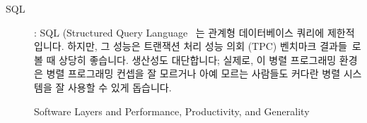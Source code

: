 \begin{description}

\item[SQL]: SQL (Structured Query Language~\cite{DIS9075SQL92} 는 관계형
	데이터베이스 쿼리에 제한적입니다.
	하지만, 그 성능은 트랜잭션 처리 성능 의회 (TPC) 벤치마크
	결과들~\cite{TPC}로 볼 때 상당히 좋습니다.
	생산성도 대단합니다; 실제로, 이 병렬 프로그래밍 환경은 병렬 프로그래밍
	컨셉을 잘 모르거나 아예 모르는 사람들도 커다란 병렬 시스템을 잘 사용할
	수 있게 돕습니다.

\end{description}

\begin{figure}[tb]
\begin{center}
\end{center}
\caption{Software Layers and Performance, Productivity, and Generality}
\label{fig:intro:Software Layers and Performance, Productivity, and Generality}
\end{figure}

